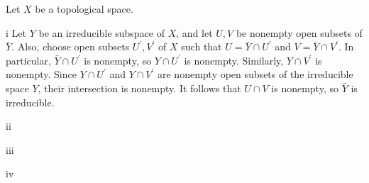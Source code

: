 \begin{exercise}
Let \(X\) be a topological space.
\end{exercise}

\begin{partsolution}{i}
Let \(Y\) be an irreducible subspace of \(X\), and let \(U, V\) be nonempty open subsets of \(\bar{Y}\).
Also, choose open subsets \(U^\prime, V^\prime\) of \(X\) such that \(U = \bar{Y} \cap U^\prime\) and \(V = \bar{Y} \cap V^\prime\).
In particular, \(\bar{Y} \cap U^\prime\) is nonempty, so \(Y \cap U^\prime\) is nonempty.
Similarly, \(Y \cap V^\prime\) is nonempty.
Since \(Y \cap U^\prime\) and \(Y \cap V^\prime\) are nonempty open subsets of the irreducible space \(Y\), their intersection is nonempty.
It follows that \(U \cap V\) is nonempty, so \(\bar{Y}\) is irreducible.
\end{partsolution}

\begin{partsolution}{ii}

\end{partsolution}

\begin{partsolution}{iii}

\end{partsolution}

\begin{partsolution}{iv}

\end{partsolution}